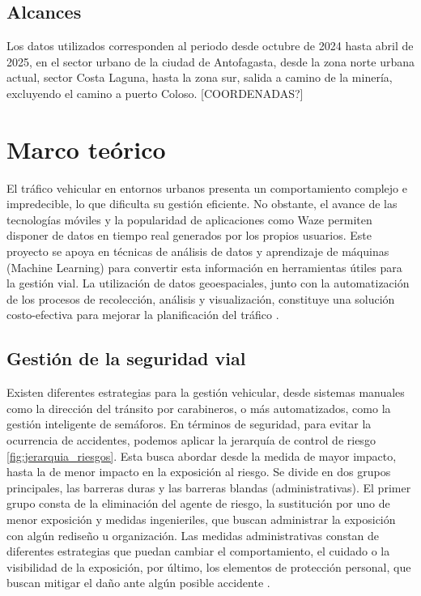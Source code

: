 \documentclass[12pt]{article}
\begin{document}
\subsection{Alcances}

Los datos utilizados corresponden al periodo desde octubre de 2024 hasta abril de 2025, en el sector urbano de la ciudad de Antofagasta, desde la zona norte urbana actual, sector Costa Laguna, hasta la zona sur, salida a camino de la minería, excluyendo el camino a puerto Coloso. [COORDENADAS?]

\section{Marco teórico}

El tráfico vehicular en entornos urbanos presenta un comportamiento complejo e impredecible, lo que dificulta su gestión eficiente. No obstante, el avance de las tecnologías móviles y la popularidad de aplicaciones como Waze permiten disponer de datos en tiempo real generados por los propios usuarios. Este proyecto se apoya en técnicas de análisis de datos y aprendizaje de máquinas (Machine Learning) para convertir esta información en herramientas útiles para la gestión vial. La utilización de datos geoespaciales, junto con la automatización de los procesos de recolección, análisis y visualización, constituye una solución costo-efectiva para mejorar la planificación del tráfico \citep{barcelo2005}.

\subsection{Gestión de la seguridad vial}

Existen diferentes estrategias para la gestión vehicular, desde sistemas manuales como la dirección del tránsito por carabineros, o más automatizados, como la gestión inteligente de semáforos. En términos de seguridad, para evitar la ocurrencia de accidentes, podemos aplicar la jerarquía de control de riesgo \cref{fig:jerarquia_riesgos}. Esta busca abordar desde la medida de mayor impacto, hasta la de menor impacto en la exposición al riesgo. Se divide en dos grupos principales, las barreras duras y las barreras blandas (administrativas). El primer grupo consta de la eliminación del agente de riesgo, la sustitución por uno de menor exposición y medidas ingenieriles, que buscan administrar la exposición con algún rediseño u organización. Las medidas administrativas constan de diferentes estrategias que puedan cambiar el comportamiento, el cuidado o la visibilidad de la exposición, por último, los elementos de protección personal, que buscan mitigar el daño ante algún posible accidente \citep{niosh2024}.
\end{document}
